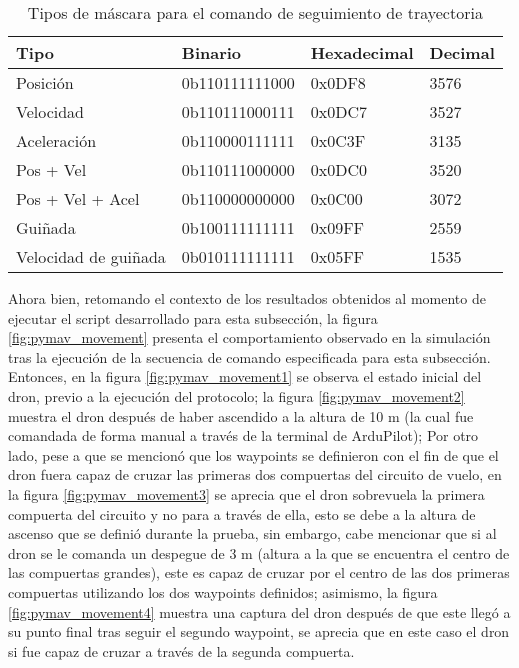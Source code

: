 \begin{table}[ht]
    \centering
    \begin{tabular}{||l|l|l|l||}
        \hline
        Tipo & Binario & Hexadecimal & Decimal\\
        \hline
        Posición & 0b110111111000 & 0x0DF8  & 3576 \\
        Velocidad & 0b110111000111 & 0x0DC7  & 3527\\
        Aceleración & 0b110000111111 & 0x0C3F & 3135 \\
        Pos + Vel & 0b110111000000 & 0x0DC0 & 3520\\  
        Pos + Vel + Acel & 0b110000000000 & 0x0C00 & 3072\\
        Guiñada & 0b100111111111 &  0x09FF & 2559\\
        Velocidad de  guiñada& 0b010111111111  & 0x05FF & 1535\\
        \hline
    \end{tabular}
    \caption{Tipos de máscara para el comando de seguimiento de trayectoria}
    \label{tab:waypoint_mask}
\end{table}

Ahora bien, retomando el contexto de los resultados obtenidos al momento de ejecutar el script desarrollado para esta subsección, 
la figura \ref{fig:pymav_movement} presenta el comportamiento observado en la simulación tras la ejecución de la secuencia de comando especificada para esta subsección. Entonces, en la figura \ref{fig:pymav_movement1} se observa el estado inicial del dron, previo a la ejecución del protocolo; la figura \ref{fig:pymav_movement2} muestra el dron después de haber ascendido a la altura de 10 m (la cual fue comandada de forma manual a través de la terminal de ArduPilot); Por otro lado, pese a que se mencionó que los waypoints se definieron con el fin de que el dron fuera capaz de cruzar las primeras dos compuertas del circuito de vuelo, en la figura \ref{fig:pymav_movement3} se aprecia que el dron sobrevuela la primera compuerta del circuito y no para a través de ella, esto se debe a la altura de ascenso que se definió durante la prueba, sin embargo, cabe mencionar que si al dron se le comanda un despegue de 3 m (altura a la que se encuentra el centro de las compuertas grandes), este es capaz de cruzar por el centro de las dos primeras compuertas utilizando los dos waypoints definidos; asimismo, la figura \ref{fig:pymav_movement4} muestra una captura del dron después de que este llegó a su punto final tras seguir el segundo waypoint, se aprecia que en este caso el dron si fue capaz de cruzar a través de la segunda compuerta.

